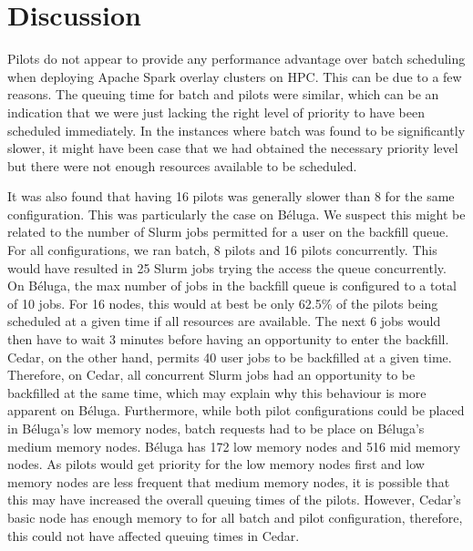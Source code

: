 \documentclass{IEEEtran}
\begin{document}
\section{Discussion}\label{sec:discussion}


Pilots do not appear to provide any performance advantage over batch
scheduling when deploying Apache Spark overlay clusters on HPC.
This can be due to a few reasons. The queuing time for batch and pilots were similar, 
which can be an indication that we were just lacking the right level of priority to 
have been scheduled immediately. In the instances where batch was found to be significantly slower,
it might have been case that we had obtained the necessary priority level but there
were not enough resources available to be scheduled.

It was also found that having 16 pilots was generally slower than 8 for the same
configuration. This was particularly the case on B\'eluga. We suspect this might be
related to the number of Slurm jobs permitted for a user on the backfill queue. For
all configurations, we ran batch, 8 pilots and 16 pilots concurrently. This would have
resulted in 25 Slurm jobs trying the access the queue concurrently. On
B\'eluga, the max number of jobs in the backfill queue is configured to a
total of 10 jobs. For 16 nodes, this would at best be only 62.5\% of the
pilots being scheduled at a given time if all resources are available.
The next 6 jobs would then have to wait 3 minutes before having an opportunity to enter the
backfill. Cedar, on the other hand, permits 40 user jobs to be backfilled at a given time.
Therefore, on Cedar, all concurrent Slurm jobs had an opportunity to be backfilled at
the same time, which may explain why this behaviour is more apparent on B\'eluga. Furthermore,
while both pilot configurations could be placed in B\'eluga's low memory nodes, batch requests
had to be place on B\'eluga's medium memory nodes. B\'eluga has 172 low memory nodes and
516 mid memory nodes. As pilots would get priority for the low memory nodes first and 
low memory nodes are less frequent that medium memory nodes, it is possible that this
may have increased the overall queuing times of the pilots. However, Cedar's basic
node has enough memory to for all batch and pilot configuration, therefore, this could not
have affected queuing times in Cedar.
\end{document}
